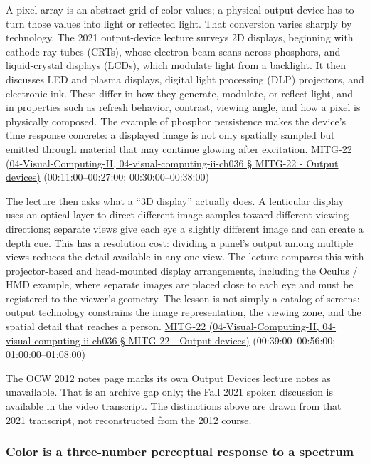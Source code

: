 A pixel array is an abstract grid of color values; a physical output device has to turn those values into light or reflected light. That conversion varies sharply by technology. The 2021 output-device lecture surveys 2D displays, beginning with cathode-ray tubes (CRTs), whose electron beam scans across phosphors, and liquid-crystal displays (LCDs), which modulate light from a backlight. It then discusses LED and plasma displays, digital light processing (DLP) projectors, and electronic ink. These differ in how they generate, modulate, or reflect light, and in properties such as refresh behavior, contrast, viewing angle, and how a pixel is physically composed. The example of phosphor persistence makes the device's time response concrete: a displayed image is not only spatially sampled but emitted through material that may continue glowing after excitation. \href{}{MITG-22 (04-Visual-Computing-II, 04-visual-computing-ii-ch036 § MITG-22 - Output devices)} (00:11:00--00:27:00; 00:30:00--00:38:00)

The lecture then asks what a ``3D display'' actually does. A lenticular display uses an optical layer to direct different image samples toward different viewing directions; separate views give each eye a slightly different image and can create a depth cue. This has a resolution cost: dividing a panel's output among multiple views reduces the detail available in any one view. The lecture compares this with projector-based and head-mounted display arrangements, including the Oculus / HMD example, where separate images are placed close to each eye and must be registered to the viewer's geometry. The lesson is not simply a catalog of screens: output technology constrains the image representation, the viewing zone, and the spatial detail that reaches a person. \href{}{MITG-22 (04-Visual-Computing-II, 04-visual-computing-ii-ch036 § MITG-22 - Output devices)} (00:39:00--00:56:00; 01:00:00--01:08:00)

The OCW 2012 notes page marks its own Output Devices lecture notes as unavailable. That is an archive gap only; the Fall 2021 spoken discussion is available in the video transcript. The distinctions above are drawn from that 2021 transcript, not reconstructed from the 2012 course.

\subsubsection{Color is a three-number perceptual response to a spectrum}\label{color-is-a-three-number-perceptual-response-to-a-spectrum}

